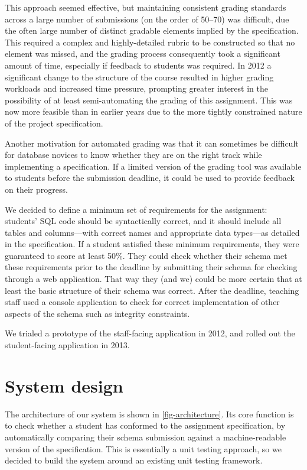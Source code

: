 \documentclass[sigconf, authordraft, capitalise]{acmart}
\begin{document}
This approach seemed effective, but maintaining consistent grading standards across a large number of submissions (on the order of 50--70) was difficult, due the often large number of distinct gradable elements implied by the specification. This required a complex and highly-detailed rubric to be constructed so that no element was missed, and the grading process consequently took a significant amount of time, especially if feedback to students was required. In 2012 a significant change to the structure of the course resulted in higher grading workloads and increased time pressure, prompting greater interest in the possibility of at least semi-automating the grading of this assignment. This was now more feasible than in earlier years due to the more tightly constrained nature of the project specification.

Another motivation for automated grading was that it can sometimes be difficult for database novices to know whether they are on the right track while implementing a specification. If a limited version of the grading tool was available to students before the submission deadline, it could be used to provide feedback on their progress.

We decided to define a minimum set of requirements for the assignment: students' SQL code should be syntactically correct, and it should include all tables and columns---with correct names and appropriate data types---as detailed in the specification. If a student satisfied these minimum requirements, they were guaranteed to score at least 50\%. They could check whether their schema met these requirements prior to the deadline by submitting their schema for checking through a web application. That way they (and we) could be more certain that at least the basic structure of their schema was correct. After the deadline, teaching staff used a console application to check for correct implementation of other aspects of the schema such as integrity constraints.

We trialed a prototype of the staff-facing application in 2012, and rolled out the student-facing application in 2013.


\section{System design}
\label{sec-design}

The architecture of our system is shown in \cref{fig-architecture}. Its core function is to check whether a student has conformed to the assignment specification, by automatically comparing their schema submission against a machine-readable version of the specification. This is essentially a unit testing approach, so we decided to build the system around an existing unit testing framework.
\end{document}
